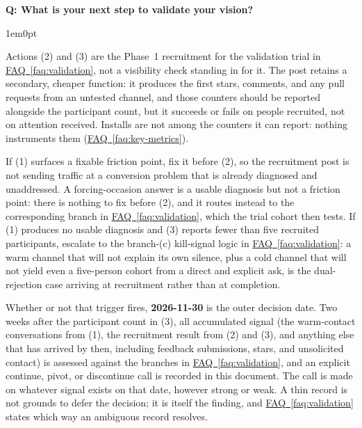 \documentclass[11pt,letterpaper]{article}
\newcounter{faqnum}
\newenvironment{faqpair}[1]{%
  \needspace{4\baselineskip}%
  \vspace{0.5em}%
  \refstepcounter{faqnum}%
  \noindent\textbf{\color{SectionBlue}Q\thefaqnum: #1}\par\nopagebreak[4]%
  \vspace{0.2em}%
  \begin{adjustwidth}{1em}{0pt}%
  \setlength{\parindent}{0pt}%
}{%
  \end{adjustwidth}%
  \vspace{0.5em}%
}
\newcommand{\faqref}[1]{\hyperref[#1]{FAQ~\ref*{#1}}}
\begin{document}
\begin{faqpair}{What is your next step to validate your vision?}
  Actions (2) and (3) are the Phase~1 recruitment for the validation trial in \faqref{faq:validation}, not a visibility check standing in for it. The post retains a secondary, cheaper function: it produces the first stars, comments, and any pull requests from an untested channel, and those counters should be reported alongside the participant count, but it succeeds or fails on people recruited, not on attention received. Installs are not among the counters it can report: nothing instruments them (\faqref{faq:key-metrics}).

  If (1) surfaces a fixable friction point, fix it before (2), so the recruitment post is not sending traffic at a conversion problem that is already diagnosed and unaddressed. A forcing-occasion answer is a usable diagnosis but not a friction point: there is nothing to fix before (2), and it routes instead to the corresponding branch in \faqref{faq:validation}, which the trial cohort then tests. If (1) produces no usable diagnosis and (3) reports fewer than five recruited participants, escalate to the branch-(c) kill-signal logic in \faqref{faq:validation}: a warm channel that will not explain its own silence, plus a cold channel that will not yield even a five-person cohort from a direct and explicit ask, is the dual-rejection case arriving at recruitment rather than at completion.

  Whether or not that trigger fires, \textbf{2026-11-30} is the outer decision date. Two weeks after the participant count in (3), all accumulated signal (the warm-contact conversations from (1), the recruitment result from (2) and (3), and anything else that has arrived by then, including feedback submissions, stars, and unsolicited contact) is assessed against the branches in \faqref{faq:validation}, and an explicit continue, pivot, or discontinue call is recorded in this document. The call is made on whatever signal exists on that date, however strong or weak. A thin record is not grounds to defer the decision; it is itself the finding, and \faqref{faq:validation} states which way an ambiguous record resolves.
\end{faqpair}
\end{document}
